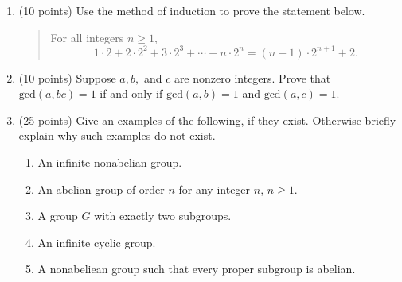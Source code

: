 \documentclass[12pt]{article}
\begin{document}
\newpage
\begin{enumerate}
\item (10 points) Use the method of induction to prove the statement below.\\
\begin{quote} For all integers $n\geq 1,$ $$1\cdot 2 +2 \cdot 2^2 +3 \cdot 2^3 + \cdots + n \cdot 2^n=(n-1) \cdot 2^{n+1}+2.$$ \end{quote}

\newpage
\item (10 points) Suppose $a,b,$ and $c$ are nonzero integers. Prove that $\text{gcd}(a,bc)=1$ if and only if $\text{gcd}(a,b)=1$ and $\text{gcd}(a,c )=1.$

\vfill 
\newpage
\item (25 points) Give an examples of the following, if they exist. Otherwise briefly explain why such examples do not exist.
	\begin{enumerate}
	\item An infinite nonabelian group.
	\vfill
	\item An abelian group of order $n$ for any integer $n$, $n\geq 1.$
	\vfill
	\item A group $G$  with exactly two subgroups.
	\vfill
	\item An infinite cyclic group.
	\vfill
	\item A nonabeliean group such that every proper subgroup is abelian.
	\vfill
	\end{enumerate}
\newpage
	

\end{enumerate}
\end{document}
